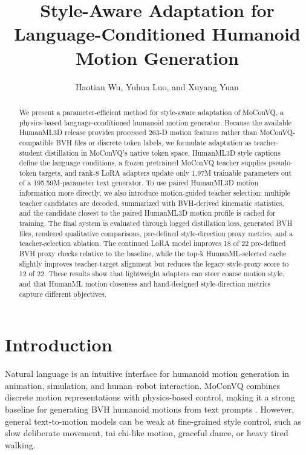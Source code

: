 \documentclass[conference]{IEEEtran}
\title{Style-Aware Adaptation for Language-Conditioned Humanoid Motion Generation}
\author{Haotian Wu, Yuhua Luo, and Xuyang Yuan}
\begin{document}
\maketitle

\begin{abstract}
We present a parameter-efficient method for style-aware adaptation of MoConVQ, a physics-based language-conditioned humanoid motion generator. Because the available HumanML3D release provides processed 263-D motion features rather than MoConVQ-compatible BVH files or discrete token labels, we formulate adaptation as teacher-student distillation in MoConVQ's native token space. HumanML3D style captions define the language conditions, a frozen pretrained MoConVQ teacher supplies pseudo-token targets, and rank-8 LoRA adapters update only 1.97M trainable parameters out of a 195.59M-parameter text generator. To use paired HumanML3D motion information more directly, we also introduce motion-guided teacher selection: multiple teacher candidates are decoded, summarized with BVH-derived kinematic statistics, and the candidate closest to the paired HumanML3D motion profile is cached for training. The final system is evaluated through logged distillation loss, generated BVH files, rendered qualitative comparisons, pre-defined style-direction proxy metrics, and a teacher-selection ablation. The continued LoRA model improves 18 of 22 pre-defined BVH proxy checks relative to the baseline, while the top-k HumanML-selected cache slightly improves teacher-target alignment but reduces the legacy style-proxy score to 12 of 22. These results show that lightweight adapters can steer coarse motion style, and that HumanML motion closeness and hand-designed style-direction metrics capture different objectives.
\end{abstract}

\IEEEpeerreviewmaketitle

\section{Introduction}
Natural language is an intuitive interface for humanoid motion generation in animation, simulation, and human--robot interaction. MoConVQ combines discrete motion representations with physics-based control, making it a strong baseline for generating BVH humanoid motions from text prompts \cite{yao2024moconvq}. However, general text-to-motion models can be weak at fine-grained style control, such as slow deliberate movement, tai chi-like motion, graceful dance, or heavy tired walking.
\end{document}
